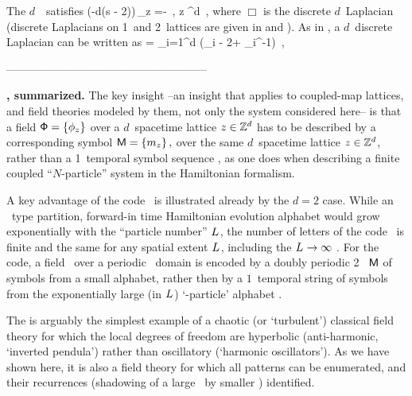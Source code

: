      {

The $d$\dmn\ \catlatt\ satisfies {\sPe} 
\beq
(\Box -d(s - 2))\,\ssp_{z} =-
\,,\qquad
{z} \in \integers^d
\,,
where $\Box$ is the discrete $d$\dmn\ Laplacian
(discrete Laplacians on 1\dmn\ and 2\dmn\ lattices are given in
 and ). As in , a
$d$\dmn\ discrete Laplacian can be written as
\beq
\Box = \sum_{i=1}^{d} (\hopMat_{i}  - 2\id + \hopMat_{i}^{-1})
\,,
    }


------------------------------------------------------

\bigskip

\noindent\textbf{\catLatt, summarized.}
The
key insight --an insight that applies to coupled-map
lattices, and field theories
modeled by them, not only the system considered here-- is that a field
\(
\Xx=\{\ssp_{z}\} %
\)
over a $d$\dmn\ spacetime lattice $z\in \mathbb{Z}^{d}$ has to be
described by a corresponding symbol {\brick}
\(
\Mm=\{\m_{z}\} %
\,,
\)
over the same $d$\dmn\ spacetime  lattice $z\in \mathbb{Z}^{d}$, rather
than a 1\dmn\ temporal symbol sequence , as one does when
describing a finite coupled ``$N$-particle'' system in the Hamiltonian
formalism.

A key advantage of the {\spt} code \Mm\ is illustrated already by the $d=2$
case. While an \AW\ type partition, forward-in time Hamiltonian evolution
alphabet would grow exponentially with the
``particle number'' ${L_{}}$, the number of letters
 of the {\spt} code \A\ is finite and the same for any
spatial extent
${L_{}}$, including the ${L_{}}\to\infty$ \catlatt. For the
{\spt} code, a field \Xx\ over a periodic \spt\ domain is encoded by a
doubly periodic 2\dmn\ {\brick} $\mathsf{M}$ of symbols from a small alphabet,
rather then by a $1$\dmn\ temporal string of symbols from the
exponentially large (in ${L_{}}$) `\speriod{}-particle' alphabet
\Aa.

The
{\catlatt} is arguably the simplest example of a chaotic (or `turbulent')
classical field theory for which the local degrees of freedom are
hyperbolic (anti-harmonic, `inverted pendula') rather than oscillatory
(`harmonic oscillators'). As we have shown here, it is also a field theory
for which all {\admissible} {\spt} patterns can be enumerated, and their
recurrences (shadowing of a large \twot\ by smaller \twots) identified.
